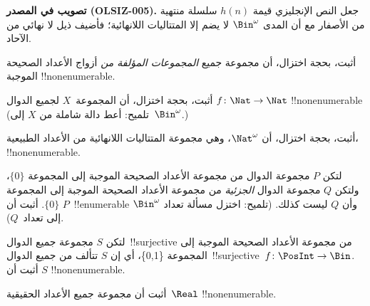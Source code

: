 \documentclass[../../../include/open-logic-section]{subfiles}
\begin{document}
\begin{editorial}
\textbf{تصويب في المصدر (OLSIZ-005).}
جعل النص الإنجليزي قيمة $h(n)$ سلسلة منتهية من الأصفار مع أن المدى
$\Bin^\omega$ لا يضم إلا المتتاليات اللانهائية؛ فأضيف ذيل لا نهائي من الآحاد.
\end{editorial}

\begin{prob}
أثبت، بحجة اختزال، أن مجموعة جميع \emph{المجموعات المؤلفة من} أزواج الأعداد
الصحيحة الموجبة !!{nonenumerable}.
\end{prob}

\begin{prob}\label{sfr:siz:red:prob:nat-nat}
  أثبت، بحجة اختزال، أن المجموعة~$X$ لجميع الدوال
  $f\colon \Nat \to \Nat$ !!{nonenumerable} (تلميح: أعط دالة شاملة
  من $X$ إلى~$\Bin^\omega$.)
\end{prob}

\begin{prob}
أثبت، بحجة اختزال، أن $\Nat^\omega$، وهي مجموعة المتتاليات اللانهائية
من الأعداد الطبيعية، !!{nonenumerable}.
\end{prob}

\begin{prob}
لتكن $P$ مجموعة الدوال من مجموعة الأعداد الصحيحة الموجبة إلى المجموعة
$\{0\}$، ولتكن $Q$ مجموعة الدوال \emph{الجزئية} من مجموعة الأعداد
الصحيحة الموجبة إلى المجموعة $\{0\}$. أثبت أن $P$~!!{enumerable} وأن
$Q$ ليست كذلك. (تلميح: اختزل مسألة تعداد $\Bin^\omega$ إلى تعداد~$Q$).
\end{prob}

\begin{prob}
لتكن $S$ مجموعة جميع الدوال~!!{surjective} من مجموعة الأعداد الصحيحة
الموجبة إلى المجموعة \{0,1\}، أي إن $S$ تتألف من جميع
الدوال~!!{surjective}~$f\colon \PosInt \to \Bin$. أثبت أن $S$
!!{nonenumerable}.
\end{prob}

\begin{prob}
أثبت أن مجموعة جميع الأعداد الحقيقية~$\Real$ !!{nonenumerable}.
\end{prob}
\end{document}

